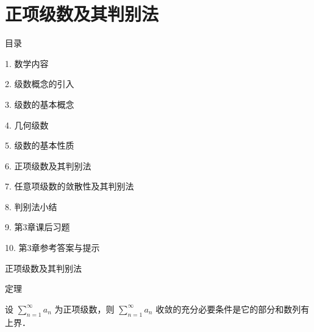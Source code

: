 \documentclass[aspectratio=169,10pt,fontset=fandol]{ctexbeamer}
\begin{document}
\section{正项级数及其判别法}
\begin{frame}[t,fragile]{目录}
\normalsize
{\color{black}\normalsize 1. 数学内容\par}\vspace{0.3em}
{\color{black}\normalsize 2. 级数概念的引入\par}\vspace{0.3em}
{\color{black}\normalsize 3. 级数的基本概念\par}\vspace{0.3em}
{\color{black}\normalsize 4. 几何级数\par}\vspace{0.3em}
{\color{black}\normalsize 5. 级数的基本性质\par}\vspace{0.3em}
{\color{blue}\normalsize 6. 正项级数及其判别法\par}\vspace{0.3em}
{\color{gray!40}\normalsize 7. 任意项级数的敛散性及其判别法\par}\vspace{0.3em}
{\color{gray!40}\normalsize 8. 判别法小结\par}\vspace{0.3em}
{\color{gray!40}\normalsize 9. 第3章课后习题\par}\vspace{0.3em}
{\color{gray!40}\normalsize 10. 第3章参考答案与提示\par}\vspace{0.3em}
\end{frame}
\begin{frame}[t,fragile]{正项级数及其判别法}
\normalsize
\begin{block}{定理}
{\normalsize
设 $\sum\limits_{n = 1}^{  \infty } a_n$ 为正项级数，则 $\sum\limits_{n = 1}^{  \infty }a_n$ 收敛的充分必要条件是它的部分和数列有上界．


}
\end{block}
\end{frame}
\end{document}
